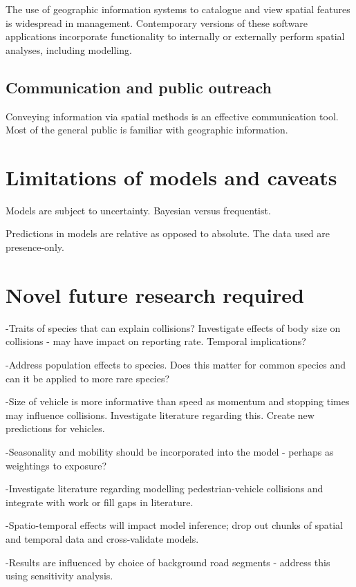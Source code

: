 The use of geographic information systems to catalogue and view spatial features is widespread in management. Contemporary versions of these software applications incorporate functionality to internally or externally perform spatial analyses, including modelling.

\subsection{Communication and public outreach}

Conveying information via spatial methods is an effective communication tool. Most of the general public is familiar with geographic information.

\section{Limitations of models and caveats}

Models are subject to uncertainty.
Bayesian versus frequentist.

Predictions in models are relative as opposed to absolute.
The data used are presence-only.

\section{Novel future research required}

-Traits of species that can explain collisions? Investigate effects of body size on collisions - may have impact on reporting rate. Temporal implications?

-Address population effects to species.  Does this matter for common species and can it be applied to more rare species?

-Size of vehicle is more informative than speed as momentum and stopping times may influence collisions. Investigate literature regarding this. Create new predictions for vehicles.

-Seasonality and mobility should be incorporated into the model - perhaps as weightings to exposure?

-Investigate literature regarding modelling pedestrian-vehicle collisions and integrate with work or fill gaps in literature.

-Spatio-temporal effects will impact model inference; drop out chunks of spatial and temporal data and cross-validate models.

-Results are influenced by choice of background road segments - address this using sensitivity analysis.

